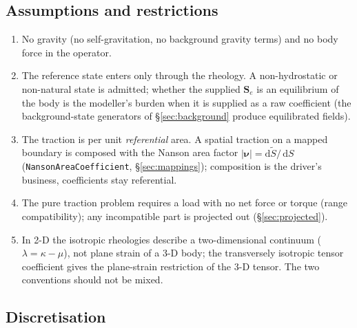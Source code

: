 \documentclass[11pt]{article}
\numberwithin{equation}{section}
\theoremstyle{remark}
\newcommand{\dS}{\,\mathrm{d}S}
\newcommand{\bnu}{\bm{\nu}}
\newcommand{\Se}{\mathbf{S}_e}
\newcommand{\code}[1]{\texttt{#1}}
\begin{document}
\subsection{Assumptions and restrictions}

\begin{enumerate}
\item No gravity (no self-gravitation, no background gravity terms) and no
  body force in the operator.
\item The reference state enters only through the rheology. A
  non-hydrostatic or non-natural state is admitted; whether the supplied
  $\Se$ is an equilibrium of the body is the modeller's burden when it is
  supplied as a raw coefficient (the background-state generators of
  \S\ref{sec:background} produce equilibrated fields).
\item The traction is per unit \emph{referential} area. A spatial traction
  on a mapped boundary is composed with the Nanson area factor
  $|\bnu| = \mathrm{d}\tilde S/\dS$ (\code{NansonAreaCoefficient},
  \S\ref{sec:mappings}); composition is the driver's business, coefficients
  stay referential.
\item The pure traction problem requires a load with no net force or
  torque (range compatibility); any incompatible part is projected out
  (\S\ref{sec:projected}).
\item In 2-D the isotropic rheologies describe a two-dimensional continuum
  ($\lambda = \kappa - \mu$), not plane strain of a 3-D body; the
  transversely isotropic tensor coefficient gives the plane-strain
  restriction of the 3-D tensor. The two conventions should not be mixed.
\end{enumerate}

\subsection{Discretisation}
\label{sec:nograv-disc}
\end{document}

